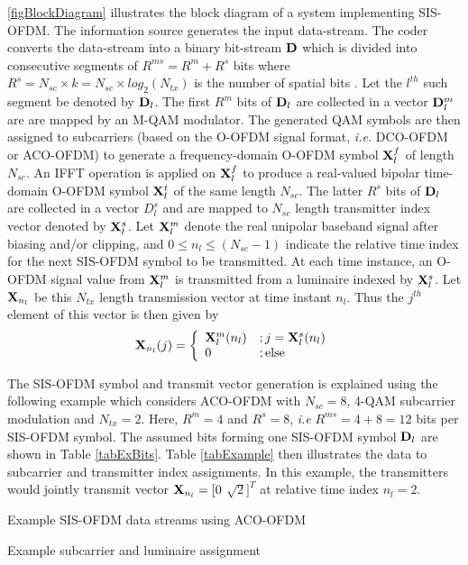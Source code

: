 \documentclass[12pt,letterpaper,onecolumn]{article} %
\newcommand{\vm}[1]{{\bf{#1}}}
\newcommand{\twopartdef}[4]
{
	\left\{
		\begin{array}{ll}
			#1 &; #2 \\
			#3 &; #4
		\end{array}
	\right.
}
\begin{document}
\figurename{\ref{figBlockDiagram}} illustrates the block diagram of a system implementing SIS-OFDM. The information source generates the input data-stream. The coder converts the data-stream into a binary bit-stream $\vm{D}$ which is divided into consecutive segments of $R^{ms}=R^{m}+R^{s}$ bits where $R^{s}=N_{sc}\times k=N_{sc}\times log_2(N_{tx})$ is the number of spatial bits . Let the $l^{th}$ such segment be denoted by $\vm{D}_l$. The first $R^{m}$ bits of $\vm{D}_l$ are collected in a vector $\vm{D}_l^m$ are are mapped by an M-QAM modulator. The generated QAM symbols are then assigned to subcarriers (based on the O-OFDM signal format, \textit{i.e.} DCO-OFDM or ACO-OFDM) to generate a frequency-domain O-OFDM symbol $\vm{X}_l^f$ of length $N_{sc}$. An IFFT operation is applied on $\vm{X}_l^f$ to produce a real-valued bipolar time-domain O-OFDM symbol $\vm{X}_l^t$ of the same length $N_{sc}$. The latter $R^{s}$ bits of $\vm{D}_l$ are collected in a vector $D_l^s$ and are mapped to $N_{sc}$ length transmitter index vector denoted by $\vm{X}_l^s$. Let $\vm{X}_l^m$ denote the real unipolar baseband signal after biasing and/or clipping, and $0\leq n_l\leq (N_{sc}-1)$ indicate the relative time index for the next SIS-OFDM symbol to be transmitted. At each time instance, an O-OFDM signal value from $\vm{X}_l^m$ is transmitted from a luminaire indexed by $\vm{X}_l^s$. Let $\vm{X}_{n_l}$ be this $N_{tx}$ length transmission vector at time instant $n_l$. Thus the $j^{th}$ element of this vector is then given by
\begin{equation}
	\label{eqX}
	\vm{X}_{n_l}(j) = \twopartdef{\vm{X}_l^m(n_l)}{j=\vm{X}_l^s(n_l)}{0}{\text{else}}
\end{equation}

The SIS-OFDM symbol and transmit vector generation is explained using the following example which considers ACO-OFDM with $N_{sc}=8$, 4-QAM subcarrier modulation and $N_{tx}=2$. Here, $R^{m}=4$ and $R^{s}=8$, \textit{i.e} $R^{ms}=4+8=12$ bits per SIS-OFDM symbol. The assumed bits forming one SIS-OFDM symbol $\vm{D}_l$ are shown in Table \ref{tabExBits}. Table \ref{tabExample} then illustrates the data to subcarrier and transmitter index assignments. In this example, the transmitters would jointly transmit vector $\vm{X}_{n_l}=[0$ $\sqrt{2}]^T$ at relative time index $n_l=2$.
\begin{table}[b]
\makebox[\textwidth]{\framebox[3in]{\rule{0pt}{1in}}}
\caption{Example SIS-OFDM data streams using ACO-OFDM}
\quad
\makebox[\textwidth]{\framebox[5in]{\rule{0pt}{2in}}}
\caption{Example subcarrier and luminaire assignment}
\end {table}
\end{document}
